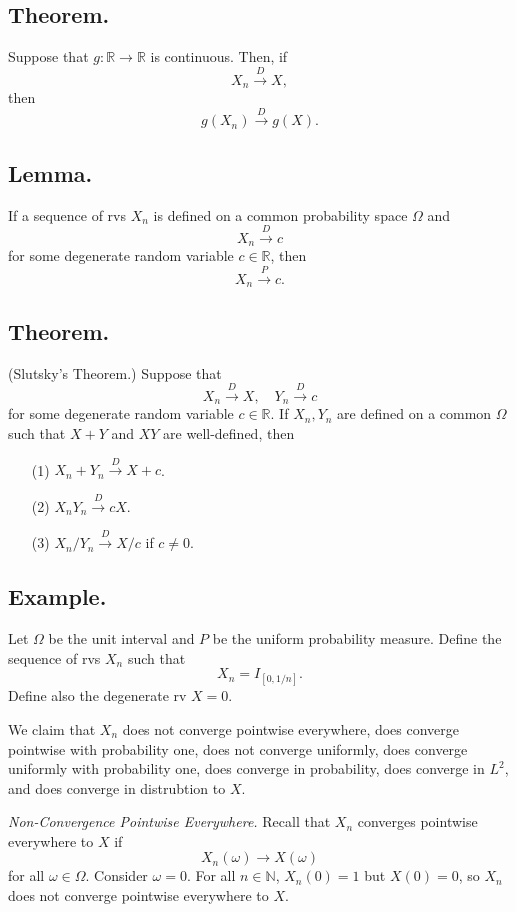 \documentclass[titlepage]{article}
\begin{document}
\subsection{Theorem.} Suppose that $g: \mathbb{R} \to \mathbb{R}$ is continuous. Then, if 
$$X_{n} \xrightarrow{D} X,$$
then
$$g(X_{n}) \xrightarrow{D} g(X).$$

\subsection{Lemma.} If a sequence of rvs $X_{n}$ is defined on a common probability space $\Omega$ and 
$$X_{n} \xrightarrow{D} c$$
for some degenerate random variable $c \in \mathbb{R}$, then 
$$X_{n} \xrightarrow{P} c.$$

\subsection{Theorem.} (Slutsky's Theorem.) Suppose that 
$$X_{n} \xrightarrow{D} X, \quad Y_{n} \xrightarrow{D} c$$
for some degenerate random variable $c \in \mathbb{R}$. If $X_{n}, Y_{n}$ are defined on a common $\Omega$ such that $X+Y$ and $XY$ are well-defined, then 
\begin{enumerate}
\item[(1)] $X_{n} + Y_{n} \xrightarrow{D} X + c$.
\item[(2)] $X_{n}Y_{n} \xrightarrow{D} cX$.
\item[(3)] $X_{n}/Y_{n} \xrightarrow{D} X/c$ if $c \neq 0$.
\end{enumerate}

\subsection{Example.} Let $\Omega$ be the unit interval and $P$ be the uniform probability measure. Define the sequence of rvs $X_{n}$ such that 
$$X_{n} = I_{[0, 1/n]}.$$
Define also the degenerate rv $X = 0$.

We claim that $X_{n}$ does not converge pointwise everywhere, does converge pointwise with probability one, does not converge uniformly, does converge uniformly with probability one, does converge in probability, does converge in $L^{2}$, and does converge in distrubtion to $X$.

\textit{Non-Convergence Pointwise Everywhere.} Recall that $X_{n}$ converges pointwise everywhere to $X$ if 
$$X_{n}(\omega) \to X(\omega)$$
for all $\omega \in \Omega$. Consider $\omega = 0$. For all $n \in \mathbb{N}$, $X_{n}(0) = 1$ but $X(0) = 0$, so $X_{n}$ does not converge pointwise everywhere to $X$.
\end{document}
